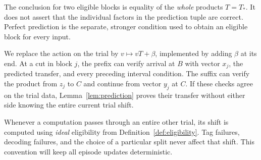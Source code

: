 The conclusion for two eligible blocks is equality of the \emph{whole}
products \(T=T_*\). It does not assert that the individual factors in
the prediction tuple are correct. Perfect prediction is the separate,
stronger condition used to obtain an eligible block for every input.

We replace the action on the trial by \(v\mapsto vT+\beta\), implemented by
adding \(\beta\) at its end. At a cut in block \(j\), the prefix can verify
arrival at \(B\) with vector \(x_j\), the predicted transfer, and every preceding
interval condition. The suffix can verify the product from \(z_j\) to \(C\)
and continue from vector \(y_j\) at \(C\). If these checks agree on the trial
data, Lemma~\ref{lem:prediction} proves their transfer without either side
knowing the entire current trial shift.

Whenever a computation passes through an entire other trial, its shift is
computed using \emph{ideal} eligibility from Definition~\ref{def:eligibility}.
Tag failures, decoding failures, and the choice of a particular split never
affect that shift. This convention will keep all episode updates deterministic.

